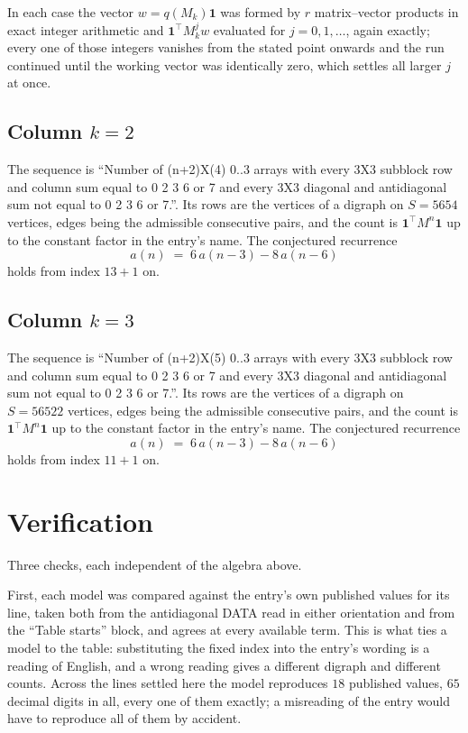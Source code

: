 \documentclass[11pt,a4paper]{article}
\theoremstyle{plain}
\theoremstyle{definition}
\begin{document}
In each case the vector $w=q(M_k)\mathbf{1}$ was formed by $r$ matrix--vector products in
exact integer arithmetic and $\mathbf{1}^{\!\top}M_k^{j}w$ evaluated for $j=0,1,\dots$,
again exactly; every one of those integers vanishes from the stated point onwards and the run
continued until the working vector was identically zero, which settles all larger $j$ at once.

\subsection*{Column $k$$=2$}
The sequence is ``Number of (n+2)X(4) 0..3 arrays with every 3X3 subblock row and column sum equal to 0 2 3 6 or 7 and every 3X3 diagonal and antidiagonal sum not equal to 0 2 3 6 or 7.''. Its rows are the vertices of a digraph on
$S=5654$ vertices, edges being the admissible consecutive pairs, and the count is
$\mathbf{1}^{\!\top}M^{n}\mathbf{1}$ up to the constant factor in the entry's name.
The conjectured recurrence
\[
a(n)\;=\;6\,a(n-3) - 8\,a(n-6)
\]
holds from index $13+1$ on.

\subsection*{Column $k$$=3$}
The sequence is ``Number of (n+2)X(5) 0..3 arrays with every 3X3 subblock row and column sum equal to 0 2 3 6 or 7 and every 3X3 diagonal and antidiagonal sum not equal to 0 2 3 6 or 7.''. Its rows are the vertices of a digraph on
$S=56522$ vertices, edges being the admissible consecutive pairs, and the count is
$\mathbf{1}^{\!\top}M^{n}\mathbf{1}$ up to the constant factor in the entry's name.
The conjectured recurrence
\[
a(n)\;=\;6\,a(n-3) - 8\,a(n-6)
\]
holds from index $11+1$ on.

\section{Verification}

Three checks, each independent of the algebra above.

First, each model was compared against the entry's own published values for its line, taken
both from the antidiagonal DATA read in either orientation and from the ``Table starts''
block, and agrees at every available term. This is what ties a model to the table:
substituting the fixed index into the entry's wording is a reading of English, and a wrong
reading gives a different digraph and different counts. Across the lines settled here the
model reproduces $18$ published values, $65$ decimal digits in all, every one of
them exactly; a misreading of the entry would have to reproduce all of them by accident.
\end{document}
